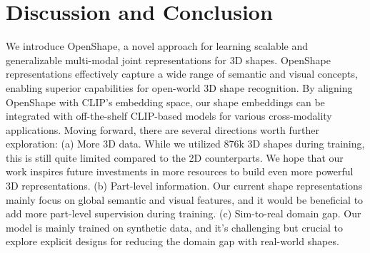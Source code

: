 \vspace{-1em}
\section{Discussion and Conclusion}
\vspace{-1em}

We introduce OpenShape, a novel approach for learning scalable and generalizable multi-modal joint representations for 3D shapes. OpenShape representations effectively capture a wide range of semantic and visual concepts, enabling superior capabilities for open-world 3D shape recognition. By aligning OpenShape with CLIP's embedding space, our shape embeddings can be integrated with off-the-shelf CLIP-based models for various cross-modality applications. Moving forward, there are several directions worth further exploration: (a) More 3D data. While we utilized 876k 3D shapes during training, this is still quite limited compared to the 2D counterparts. We hope that our work inspires future investments in more resources to build even more powerful 3D representations. (b) Part-level information. Our current shape representations mainly focus on global semantic and visual features, and it would be beneficial to add more part-level supervision during training. (c) Sim-to-real domain gap. Our model is mainly trained on synthetic data, and it's challenging but crucial to explore explicit designs for reducing the domain gap with real-world shapes.

